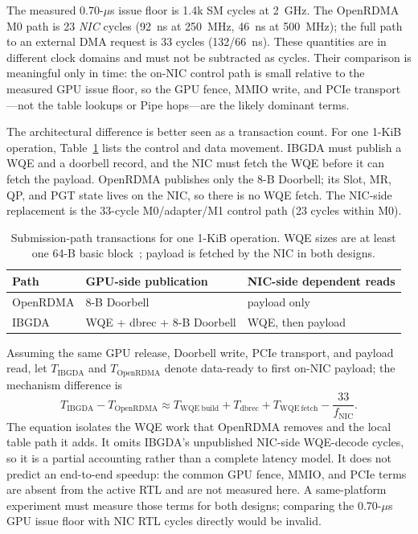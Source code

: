 The measured 0.70-$\mu$s issue floor is 1.4k SM cycles at 2~GHz.  The
OpenRDMA M0 path is 23 \emph{NIC} cycles (92~ns at 250~MHz, 46~ns at 500~MHz);
the full path to an external DMA request is 33 cycles (132/66~ns).  These
quantities are in different clock domains and must not be subtracted as
cycles.  Their comparison is meaningful only in time: the on-NIC control path
is small relative to the measured GPU issue floor, so the GPU fence, MMIO
write, and PCIe transport—not the table lookups or Pipe hops—are the likely
dominant terms.

The architectural difference is better seen as a transaction count.  For one
1-KiB operation, Table~\ref{tab:eval:transactions} lists the control and data
movement.  IBGDA must publish a WQE and a doorbell record, and the NIC must
fetch the WQE before it can fetch the payload.  OpenRDMA publishes only the
8-B Doorbell; its Slot, MR, QP, and PGT state lives on the NIC, so there is no
WQE fetch.  The NIC-side replacement is the 33-cycle M0/adapter/M1 control path
(23 cycles within M0).

\begin{table}[H]
  \centering
  \caption{Submission-path transactions for one 1-KiB operation.  WQE sizes
  are at least one 64-B basic block~\cite{baydamirli2026gpu}; payload is
  fetched by the NIC in both designs.}
  \label{tab:eval:transactions}
  \footnotesize
  \begin{tabular}{@{}p{}p{}p{}@{}}
    \toprule
    Path & GPU-side publication & NIC-side dependent reads \\
    \midrule
    OpenRDMA & 8-B Doorbell & payload only \\
    IBGDA & WQE + dbrec + 8-B Doorbell & WQE, then payload \\
    \bottomrule
  \end{tabular}
\end{table}

Assuming the same GPU release, Doorbell write, PCIe transport, and payload
read, let $T_{\mathrm{IBGDA}}$ and $T_{\mathrm{OpenRDMA}}$ denote data-ready
to first on-NIC payload; the mechanism difference is
\begin{equation}
  T_{\mathrm{IBGDA}} - T_{\mathrm{OpenRDMA}}
  \approx T_{\mathrm{WQE\ build}} + T_{\mathrm{dbrec}}
  + T_{\mathrm{WQE\ fetch}} - \frac{33}{f_{\mathrm{NIC}}}.
\end{equation}
The equation isolates the WQE work that OpenRDMA removes and the local table
path it adds.  It omits IBGDA's unpublished NIC-side WQE-decode cycles, so it
is a partial accounting rather than a complete latency model.  It does not
predict an end-to-end speedup: the common GPU fence, MMIO, and PCIe terms are
absent from the active RTL and are not measured here.
A same-platform experiment must measure those terms for both designs; comparing
the 0.70-$\mu$s GPU issue floor with NIC RTL cycles directly would be invalid.

